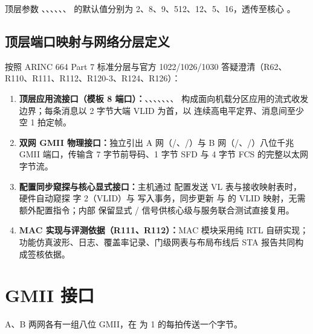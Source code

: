 顶层参数 、、、、、、 的默认值分别为 2、8、9、512、12、5、16，透传至核心 。

\subsection{顶层端口映射与网络分层定义}

按照 ARINC 664 Part 7 标准分层与官方 1022/1026/1030 答疑澄清（R62、R110、R111、R112、R120-3、R124、R126）：
\begin{enumerate}[leftmargin=2em,itemsep=1pt]
  \item \textbf{顶层应用流接口（模板 8 端口）：}、、、、、、、 构成面向机载分区应用的流式收发边界；每条消息以 2 字节大端 VLID 为首，以  连续高电平定界、消息间至少空 1 拍定帧。
  \item \textbf{双网 GMII 物理接口：}独立引出 A 网（/、/）与 B 网（/、/）八位千兆 GMII 端口，传输含 7 字节前导码、1 字节 SFD 与 4 字节 FCS 的完整以太网字节流。
  \item \textbf{配置同步窥探与核心显式接口：}主机通过  配置发送 VL 表与接收映射表时， 硬件自动窥探  字 2（VLID）与  写入事务，同步更新  与  的 VLID 映射，无需额外配置指令；内部  保留显式 / 信号供核心级与服务联合测试直接复用。
  \item \textbf{MAC 实现与评测依据（R111、R112）：}MAC 模块采用纯 RTL 自研实现；功能仿真波形、日志、覆盖率记录、门级网表与布局布线后 STA 报告共同构成签核依据。
\end{enumerate}

\section{GMII 接口}\label{sec:gmii}

A、B 两网各有一组八位 GMII，在  为 1 的每拍传送一个字节。

